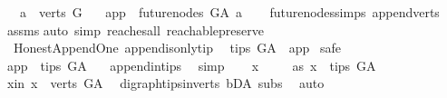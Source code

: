 \begin{isabellebody}
\ \ \ {\isachardoublequoteopen}a\ {\isasymin}\ verts\ G{\isachardoublequoteclose}\isanewline
\ \ \ {\isachardoublequoteopen}app\ {\isasymin}\ future{\isacharunderscore}{\kern0pt}nodes\ G{\isacharunderscore}{\kern0pt}A\ a{\isachardoublequoteclose}\isanewline
%
\isadelimproof
\ \ %
\endisadelimproof
%
\isatagproof
{}\isamarkupfalse%
\ future{\isacharunderscore}{\kern0pt}nodes{\isachardot}{\kern0pt}simps\ append{\isacharunderscore}{\kern0pt}verts\isanewline
\ \ \isamarkupfalse%
\ assms\isanewline
{}\isamarkupfalse%
{\isacharparenleft}{\kern0pt}auto\ simp{\isacharcolon}{\kern0pt}\ reaches{\isacharunderscore}{\kern0pt}all\ reachable{}{\isacharunderscore}{\kern0pt}preserve{\isacharparenright}{\kern0pt}\ \isamarkupfalse%
%
\endisatagproof
{\isafoldproof}%
%
\isadelimproof
\isanewline
%
\endisadelimproof
\isanewline
{}\isamarkupfalse%
\ {\isacharparenleft}{\kern0pt}\ Honest{\isacharunderscore}{\kern0pt}Append{\isacharunderscore}{\kern0pt}One{\isacharparenright}{\kern0pt}\ append{\isacharunderscore}{\kern0pt}is{\isacharunderscore}{\kern0pt}only{\isacharunderscore}{\kern0pt}tip{\isacharcolon}{\kern0pt}\isanewline
\ \ {\isachardoublequoteopen}tips\ G{\isacharunderscore}{\kern0pt}A\ {\isacharequal}{\kern0pt}\ {\isacharbraceleft}{\kern0pt}app{\isacharbraceright}{\kern0pt}{\isachardoublequoteclose}\isanewline
%
\isadelimproof
%
\endisadelimproof
%
\isatagproof
{}\isamarkupfalse%
\ safe\isanewline
\ \ \isamarkupfalse%
\ {\isachardoublequoteopen}app\ {\isasymin}\ tips\ G{\isacharunderscore}{\kern0pt}A\ {\isachardoublequoteclose}\ \isamarkupfalse%
\ append{\isacharunderscore}{\kern0pt}in{\isacharunderscore}{\kern0pt}tips\ \isamarkupfalse%
\ simp\isanewline
\ \ \isamarkupfalse%
\ x\ \isanewline
\ \ \isamarkupfalse%
\ as{}{\isacharcolon}{\kern0pt}\ {\isachardoublequoteopen}x\ {\isasymin}\ tips\ G{\isacharunderscore}{\kern0pt}A{\isachardoublequoteclose}\isanewline
\ \ \isamarkupfalse%
\ \isamarkupfalse%
\ x{\isacharunderscore}{\kern0pt}in{\isacharcolon}{\kern0pt}\ {\isachardoublequoteopen}x\ {\isasymin}\ verts\ G{\isacharunderscore}{\kern0pt}A{\isachardoublequoteclose}\ \isamarkupfalse%
\ digraph{\isachardot}{\kern0pt}tips{\isacharunderscore}{\kern0pt}in{\isacharunderscore}{\kern0pt}verts\ bD{\isacharunderscore}{\kern0pt}A\ subs\ \isamarkupfalse%
\ auto\ \isanewline

\end{isabellebody}
